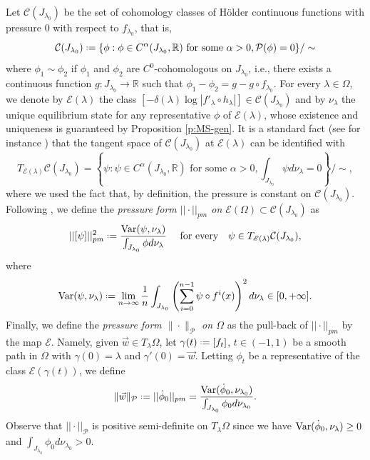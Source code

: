 \documentclass[11pt]{amsart}
\theoremstyle{plain}
\theoremstyle{definition}
\theoremstyle{remark}
\newcommand*{\defeq}{\mathrel{\vcenter{\baselineskip0.5ex \lineskiplimit0pt
			\hbox{\scriptsize.}\hbox{\scriptsize.}}}%
	=}
\begin{document}
Let $\mathcal{C}
(J_{\lambda_0})$ be the set of cohomology classes of H\"older continuous functions with pressure $0$
with respect to $f_{\lambda_0}$,
that is,
$$\mathcal{C}
(J_{\lambda_0}) \defeq \{\phi: \phi \in C^{\alpha}(J_{\lambda_0},\mathbb{R}) \text{ for some } \alpha>0, \mathcal{P}(\phi) = 
0\}/ \sim$$
where $\phi_1 \sim \phi_2$ if $\phi_1$ and  $\phi_2$ are $C^0$-cohomologous
on $J_{\lambda_0}$, i.e., there exists a continuous function $g \colon J_{\lambda_0} \to \mathbb R$ such that $\phi_1 - \phi_2 = g - g \circ f_{\lambda_0}$.
For every $\lambda \in \Omega$, we denote by $\mathscr{E}(\lambda)$ the  class
$[-\delta(\lambda)\log|f'_\lambda \circ h_\lambda|]\in \mathcal C (J_{\lambda_0})$
and by
 $\nu_\lambda$
the unique 
equilibrium state for
any representative $\phi$ of 
$\mathscr E (\lambda)$, whose existence and uniqueness is guaranteed by Proposition \ref{p:MS-gen}. 
It is a standard fact 
(see for instance \cite[p. 375]{McMullen08})
that
the tangent space 
of $\mathcal{C}
(J_{\lambda_0})$ at $\mathscr{E}(\lambda)$ can be identified with 
$$T_{\mathscr{E}(\lambda)}\mathcal{C}(J_{\lambda_0}) = \left\{\psi 
\colon \psi
\in C^{\alpha}(J_{\lambda_0},\mathbb{R}) \text{ for some } \alpha>0,
\int_{J_{\lambda_0}} \psi d\nu_\lambda = 0  \right\} / \sim,$$
where we used the fact
that, by definition, the pressure is constant on $\mathcal C(J_{\lambda_0})$.
Following \cite[p. 375]{McMullen08}, we define the {\it pressure form $||\cdot||_{pm}$ on $\mathscr{E}(\Omega) \subset \mathcal{C}(J_{\lambda_0})$}
as
$$||[\psi]||^2_{pm} \defeq \frac{{\rm Var}(\psi,\nu_\lambda)}{\int_{J_{\lambda_0}} \phi d\nu_\lambda}
\quad
\mbox{ for every}
\quad
\psi \in T_{\mathscr{E}(\lambda)}\mathcal{C}(J_{\lambda_0}),$$
where 
$${\rm Var}(\psi, \nu_\lambda) \defeq \lim_{n \to \infty} \frac{1}{n} \int_{J_{\lambda_0}} \left( \sum_{i=0}^{n-1} \psi \circ f^i(x) \right)^2 d\nu_\lambda
\in [0,+\infty].$$
Finally,
we define the
\emph{pressure form $\|\cdot\|_{\mathcal P}$
on $\Omega$} 
as the pull-back
of $||\cdot||_{pm}$ by the map $\mathscr E$. Namely,
given $\vec{w} \in T_{\lambda}\Omega$, let $\gamma(t)\defeq [f_t]$,
$t \in (-1,1)$ be a smooth path in $\Omega$
with $\gamma(0)=\lambda$ and $\gamma'(0)= \vec{w}$.
Letting $\phi_t$ be a representative of the class $\mathscr{E}(\gamma(t))$,
we define
\begin{equation*}
\|\vec{w}\|_{\mathcal P}
\defeq ||\dot{\phi}_0||_{pm} =
\frac{{\rm Var}(\dot{\phi}_0,\nu_{\lambda_0})}{\int_{J_{\lambda_0}} \phi_0 d\nu_{\lambda_0}}.
\end{equation*}
Observe that 
$||\cdot||_{\mathcal{P}}$ is positive semi-definite on $T_\lambda\Omega$ since 
we have ${\rm Var}(\dot{\phi}_0,\nu_\lambda) \ge 0$
and $\int_{J_{\lambda_0}} \phi_0 d\nu_{\lambda_0} > 0$.
\end{document}
